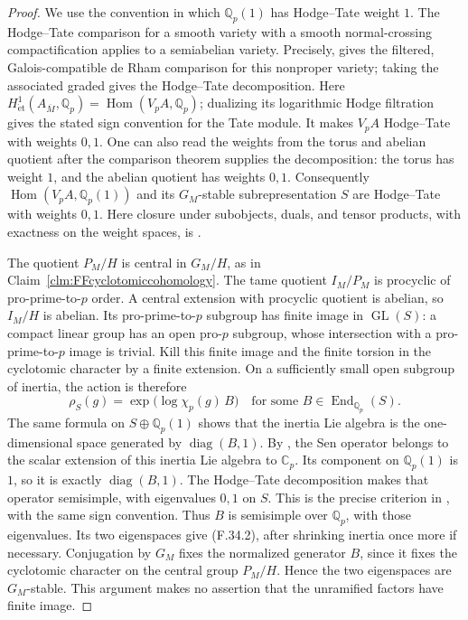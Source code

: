 \documentclass[11pt]{article}
\begin{document}
\begin{proof}
We use the convention in which \(\mathbb Q_p(1)\)
has Hodge--Tate weight \(1\). The Hodge--Tate comparison
for a smooth variety with a smooth normal-crossing
compactification applies to a semiabelian variety.
Precisely, \citet[Proposition in Section~3.4 and
Theorem~3.6, especially proof~(d)]{FF_Beilinson2012}
gives the filtered, Galois-compatible de Rham
comparison for this nonproper variety; taking
the associated graded gives the Hodge--Tate
decomposition.
Here \(H^1_{\mathrm{\acute et}}(A_{\overline M},\mathbb Q_p)
=\operatorname{Hom}(V_pA,\mathbb Q_p)\); dualizing
its logarithmic Hodge filtration gives the stated
sign convention for the Tate module.
It makes \(V_pA\) Hodge--Tate with weights \(0,1\).
One can also read the weights from the torus and abelian
quotient after the comparison theorem supplies the
decomposition: the torus has weight \(1\), and the
abelian quotient has weights \(0,1\).
Consequently \(\operatorname{Hom}(V_pA,\mathbb Q_p(1))\)
and its \(G_M\)-stable subrepresentation \(S\) are
Hodge--Tate with weights \(0,1\).
Here closure under subobjects, duals, and tensor
products, with exactness on the weight spaces, is
\citet[Theorem~4.2]{FF_Fontaine2004}.

The quotient \(P_M/H\) is central in \(G_M/H\), as in
Claim~\ref{clm:FFcyclotomiccohomology}. The tame quotient
\(I_M/P_M\) is procyclic of pro-prime-to-\(p\) order.
A central extension with procyclic quotient is abelian,
so \(I_M/H\) is abelian. Its pro-prime-to-\(p\)
subgroup has finite image in \(\operatorname{GL}(S)\):
a compact linear group has an open pro-\(p\) subgroup,
whose intersection with a pro-prime-to-\(p\) image is
trivial. Kill this finite image and the finite torsion
in the cyclotomic character by a finite extension.
On a sufficiently small open subgroup of inertia,
the action is therefore
\[
           \rho_S(g)=\exp\bigl(\log\chi_p(g)\,B\bigr)
              \quad\text{for some }B\in\operatorname{End}_{\mathbb Q_p}(S).
                                                        \tag{F.34.3}
\]
The same formula on \(S\oplus\mathbb Q_p(1)\)
shows that the inertia Lie algebra is the
one-dimensional space generated by \(\operatorname{diag}(B,1)\).
By \citet[Theorem~3.1, with \(d=0\)]{FF_Ohkubo2014},
the Sen operator belongs to the scalar extension of
this inertia Lie algebra to \(\mathbb C_p\).
Its component on \(\mathbb Q_p(1)\) is \(1\), so
it is exactly \(\operatorname{diag}(B,1)\).
The Hodge--Tate decomposition makes that operator
semisimple, with eigenvalues \(0,1\) on \(S\).
This is the precise criterion in
\citet[Section~2.7, printed p.~45]{FF_Fontaine2004},
with the same sign convention.
Thus \(B\) is semisimple over \(\mathbb Q_p\),
with those eigenvalues. Its two eigenspaces give
(F.34.2), after shrinking inertia once more if necessary.
Conjugation by \(G_M\) fixes the normalized generator
\(B\), since it fixes the cyclotomic character on
the central group \(P_M/H\). Hence the two eigenspaces
are \(G_M\)-stable. This argument makes no assertion
that the unramified factors have finite image.


\end{proof}
\end{document}
